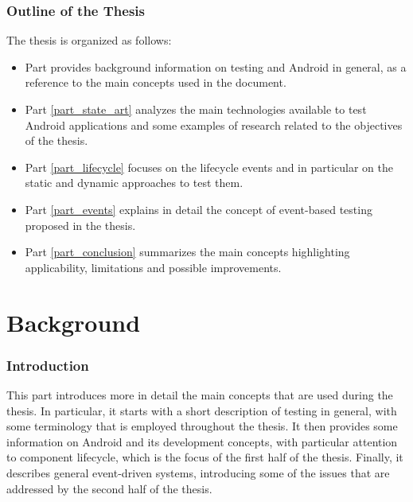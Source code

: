 \documentclass[11pt,a4paper,notitlepage]{article}
\begin{document}
\section{Outline of the Thesis}
The thesis is organized as follows:
\begin{itemize}
	\item Part \ref{part_background} provides background information on testing and Android in general, as a reference to the main concepts used in the document.
	\item Part \ref{part_state_art} analyzes the main technologies available to test Android applications and some examples of research related to the objectives of the thesis.
	\item Part \ref{part_lifecycle} focuses on the lifecycle events and in particular on the static and dynamic approaches to test them.
	\item Part \ref{part_events} explains in detail the concept of event-based testing proposed in the thesis.
	\item Part \ref{part_conclusion} summarizes the main concepts highlighting applicability, limitations and possible improvements.
\end{itemize}



\newpage
\part{Background}\label{part_background}

\section{Introduction}
This part introduces more in detail the main concepts that are used during the thesis. In particular, it starts with a short description of testing in general, with some terminology that is employed throughout the thesis. It then provides some information on Android and its development concepts, with particular attention to component lifecycle, which is the focus of the first half of the thesis. Finally, it describes general event-driven systems, introducing some of the issues that are addressed by the second half of the thesis.
\end{document}
